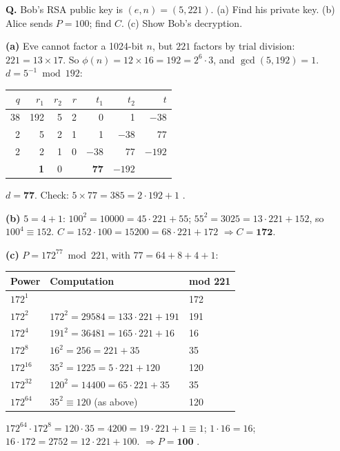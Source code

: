 \begin{worked}
\textbf{Q.} Bob's RSA public key is $(e, n) = (5, 221)$. (a) Find his private key. (b) Alice sends $P = 100$; find $C$. (c) Show Bob's decryption.

\textbf{(a)} Eve cannot factor a 1024-bit $n$, but $221$ factors by trial division: $221 = 13 \times 17$. So $\phi(n) = 12 \times 16 = 192 = 2^6 \cdot 3$, and $\gcd(5, 192) = 1$. $d = 5^{-1} \bmod 192$:
\begin{center}\small
\begin{tabular}{@{}r|rrr|rrr@{}}
\toprule
$q$ & $r_1$ & $r_2$ & $r$ & $t_1$ & $t_2$ & $t$\\
\midrule
38 & 192 & 5 & 2 & 0 & 1 & $-38$\\
2 & 5 & 2 & 1 & 1 & $-38$ & 77\\
2 & 2 & 1 & 0 & $-38$ & 77 & $-192$\\
 & \textbf{1} & 0 & & \textbf{77} & $-192$ & \\
\bottomrule
\end{tabular}
\end{center}
$d = \mathbf{77}$. Check: $5 \times 77 = 385 = 2 \cdot 192 + 1$ \checkmark.

\textbf{(b)} $5 = 4 + 1$: \;$100^2 = 10000 = 45 \cdot 221 + 55$; \;$55^2 = 3025 = 13 \cdot 221 + 152$, so $100^4 \equiv 152$. \;$C = 152 \cdot 100 = 15200 = 68 \cdot 221 + 172$ $\Rightarrow C = \mathbf{172}$.

\textbf{(c)} $P = 172^{77} \bmod 221$, with $77 = 64 + 8 + 4 + 1$:
\begin{center}\small
\begin{tabular}{@{}lll@{}}
\toprule
Power & Computation & mod 221\\
\midrule
$172^{1}$ & & 172\\
$172^{2}$ & $172^2 = 29584 = 133\cdot221 + 191$ & 191\\
$172^{4}$ & $191^2 = 36481 = 165\cdot221 + 16$ & 16\\
$172^{8}$ & $16^2 = 256 = 221 + 35$ & 35\\
$172^{16}$ & $35^2 = 1225 = 5\cdot221 + 120$ & 120\\
$172^{32}$ & $120^2 = 14400 = 65\cdot221 + 35$ & 35\\
$172^{64}$ & $35^2 \equiv 120$ (as above) & 120\\
\bottomrule
\end{tabular}
\end{center}
$172^{64} \cdot 172^{8} = 120 \cdot 35 = 4200 = 19 \cdot 221 + 1 \equiv 1$; \;$1 \cdot 16 = 16$; \;$16 \cdot 172 = 2752 = 12 \cdot 221 + 100$. \;$\Rightarrow P = \mathbf{100}$ \checkmark.
\end{worked}

